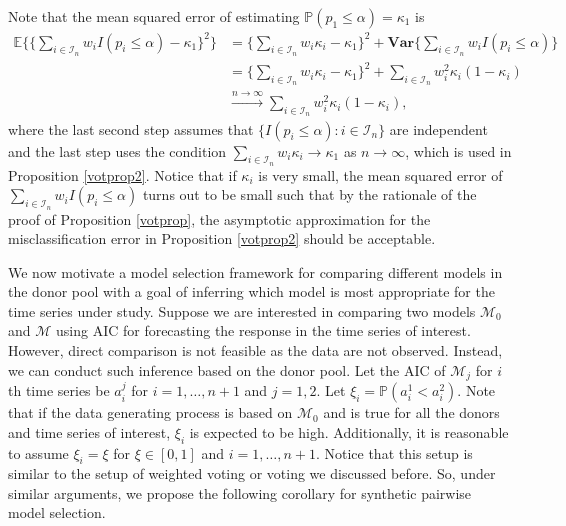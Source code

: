 \documentclass[11pt]{article}
\def\mc#1{\mathcal{#1}} %
\def\E{\mathbb{E}} %
\def\mc#1{\mathcal{#1}}
\def\var#1{\mathrm{Var}(#1)} %
\def\P{\mathbb{P}}
\def\var{\mathbf{Var}}
\theoremstyle{definition}
\begin{document}
Note that the mean squared error of estimating $\P(p_1\leq \alpha)=\kappa_1$ is
\begin{align*}
	\E\bigg\{ \Big\{ \sum_{i\in \mc{I}_n} w_i I(p_i\leq \alpha)-\kappa_1 \Big\}^2 \bigg\}
	&= \Big\{ \sum_{i\in \mc{I}_n} w_i \kappa_i -\kappa_1 \Big\}^2 + \var 
	\Big\{\sum_{i\in \mc{I}_n} w_i I(p_i\leq \alpha) \Big\}\\
	&= \Big\{ \sum_{i\in \mc{I}_n} w_i \kappa_i -\kappa_1 \Big\}^2  + \sum_{i\in \mc{I}_n} w_i^2 \kappa_i (1-\kappa_i) \\
	& \overset{n\to \infty }{\to} \sum_{i\in \mc{I}_n} w_i^2 \kappa_i (1-\kappa_i) ,
\end{align*}
where the last second step assumes that $\{I(p_i\leq \alpha)\colon i\in \mc{I}_n\}$ are independent and the last step uses the condition $\sum_{i\in \mc{I}_n} w_i \kappa_i \to \kappa_1$ as $n\to \infty$, which is used in Proposition \ref{votprop2}. Notice that if $\kappa_i$ is very small, the mean squared error of $\sum_{i\in \mc{I}_n} w_i I(p_i\leq \alpha)$ turns out to be small such that by the rationale of the proof of Proposition \ref{votprop}, the asymptotic approximation for the misclassification error in  Proposition \ref{votprop2} should be acceptable. 



We now motivate a model selection framework for comparing different models in the donor pool with a goal of inferring which model is most appropriate for the time series under study. Suppose we are interested in comparing two models $\mc{M}_0$ and $\mc{M}$ using AIC for forecasting the response in the time series of interest. However, direct comparison is not feasible as the data are not observed. Instead, we can conduct such inference based on the donor pool. Let the AIC of $\mc{M}_j$ for $i$th time series be $a_i^j$ for $i = 1, \ldots, n+1$ and $j = 1, 2$. Let $\xi_i = \P(a_i^1 < a_i^2)$. Note that if the data generating process is based on $\mc{M}_0$ and is true for all the donors and time series of interest, $\xi_i$ is expected to be high. Additionally, it is reasonable to assume $\xi_i =\xi $ for $\xi \in [0,1]$ and $i = 1, \ldots, n+1$.  Notice that this setup is similar to the setup of weighted voting or voting we discussed before. So, under similar arguments, we propose the following corollary for synthetic pairwise model selection.
\end{document}
